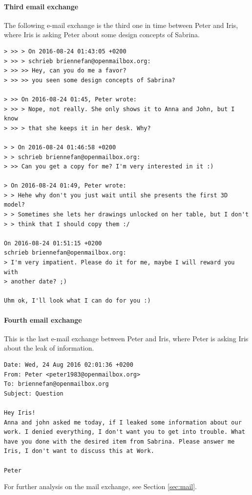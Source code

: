 \documentclass[12pt]{article}
\begin{document}
\paragraph{Third email exchange}
The following e-mail exchange is the third one in time between Peter and Iris, where Iris is asking Peter about some design concepts of Sabrina.

\begin{shaded}
\begin{verbatim}
> >> > On 2016-08-24 01:43:05 +0200
> >> > schrieb briennefan@openmailbox.org:
> >> >> Hey, can you do me a favor?
> >> >> you seen some design concepts of Sabrina?

> >> On 2016-08-24 01:45, Peter wrote:
> >> > Nope, not really. She only shows it to Anna and John, but I know
> >> > that she keeps it in her desk. Why?

> > On 2016-08-24 01:46:58 +0200
> > schrieb briennefan@openmailbox.org:
> >> Can you get a copy for me? I'm very interested in it :)

> On 2016-08-24 01:49, Peter wrote:
> > Hehe why don't you just wait until she presents the first 3D model?
> > Sometimes she lets her drawings unlocked on her table, but I don't
> > think that I should copy them :/

On 2016-08-24 01:51:15 +0200
schrieb briennefan@openmailbox.org:
> I'm very impatient. Please do it for me, maybe I will reward you with 
> another date? ;)

Uhm ok, I'll look what I can do for you :)
\end{verbatim}
\end{shaded}

\paragraph{Fourth email exchange}
This is the last e-mail exchange between Peter and Iris, where Peter is asking Iris about the leak of information.

\begin{shaded}
\begin{verbatim}
Date: Wed, 24 Aug 2016 02:01:36 +0200
From: Peter <peter1983@openmailbox.org>
To: briennefan@openmailbox.org
Subject: Question

Hey Iris!
Anna and john asked me today, if I leaked some information about our
work. I denied everything, I don't want you to get into trouble. What
have you done with the desired item from Sabrina. Please answer me
Iris, I don't want to discuss this at Work.

Peter
\end{verbatim}
\end{shaded}
For further analysis on the mail exchange, see Section \ref{sec:mail}.
\end{document}
